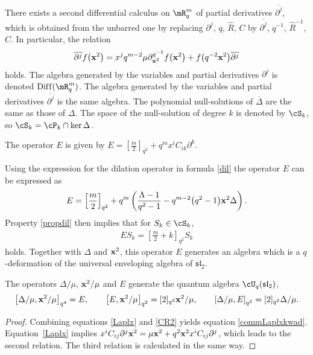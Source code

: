 There exists a second dif\/ferential calculus on $\mR^m_q$ of partial derivatives $\overline{\partial^j}$, which is obtained from the unbarred one by replacing $\partial^j$, $q$, $\hat{R}$, $C$ by $\overline{\partial^j}$, $q^{-1}$, $\hat{R}^{-1}$, $C$. In particular, the relation
\begin{gather}
\label{partialrbar}
\overline{\partial^j}f\big(\bold{x}^2\big) = x^jq^{m-2}\mu\partial_{\bold{x}^2}^{q^{-2}}f\big(\bold{x}^2\big)+f\big(q^{-2}\bold{x}^2\big)\overline{\partial^j}
\end{gather}
holds. The algebra generated by the variables and partial derivatives $\partial^j$ is denoted ${\rm Dif\/f}(\mR^m_q)$. The algebra generated by the variables and partial derivatives $\overline{\partial^j}$ is the same algebra. The polynomial null-solutions of $\overline{\Delta}$ are the same as those of $\Delta$. The space of the null-solution of degree $k$ is denoted by $\cS_k$, so $\cS_k=\cP_k\cap \ker \Delta$.


\begin{definition}
The operator $E$ is given by $E=[\frac{m}{2}]_{q^2}+q^mx^iC_{ik}\partial^k$.
\end{definition}

Using the expression for the dilation operator in formula \eqref{dil} the operator $E$ can be expressed as
\begin{gather*}
E= \left[\frac{m}{2}\right]_{q^2}+q^m\left(\frac{\Lambda-1}{q^2-1}-q^{m-2}\big(q^2-1\big)\bold{x}^2\Delta\right).
\end{gather*}
Property \eqref{propdil} then implies that for $S_k\in\cS_k$,
\begin{gather}
\label{Eharm}
ES_k = \left[\frac{m}{2}+k\right]_{q^2}S_k
\end{gather}
holds. Together with $\Delta$ and $\bold{x}^2$, this operator $E$ generates an algebra which is a $q$-deformation of the universal enveloping algebra of $\mathfrak{sl}_2$.
\begin{theorem}
\label{sl2}
The operators $\Delta/\mu$, $\bold{x}^2/\mu$ and $E$ generate the quantum algebra $\cU_q(\mathfrak{sl}_2)$,
\begin{gather}
\label{commLaplxkwad}
\left[\Delta/\mu,\bold{x}^2/\mu\right]_{q^4}=E,\qquad
\left[E,\bold{x}^2/\mu\right]_{q^2}=[2]_{q^2} \bold{x}^2/\mu,\qquad
\left[\Delta /\mu,E\right]_{q^2}=[2]_{q^2} \Delta/\mu.
\end{gather}
\end{theorem}

\begin{proof}\sloppy
Combining equations \eqref{Laplx} and \eqref{CR2} yields equation \eqref{commLaplxkwad}. Equation~\eqref{Laplx} implies $x^iC_{ij}\partial^j\bold{x}^2 =\mu \bold{x}^2+q^2\bold{x}^2x^iC_{ij}\partial^j$, which leads to the second relation. The third relation is calculated in the same way.
\end{proof}

